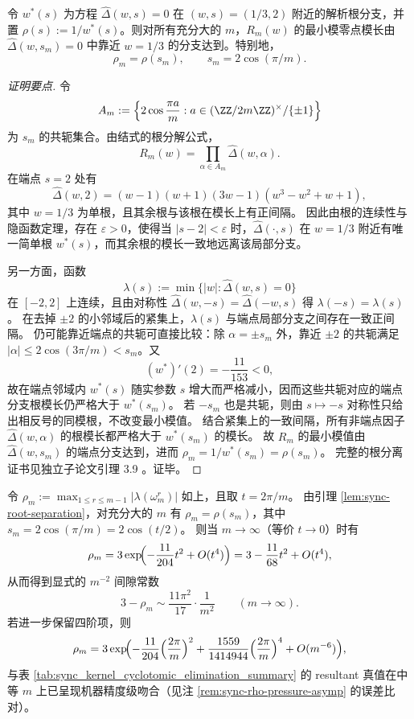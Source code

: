 \begin{lemma}\label{lem:sync-root-separation}
令 \(w^\ast(s)\) 为方程 \(\widehat\Delta(w,s)=0\) 在 \((w,s)=(1/3,2)\) 附近的解析根分支，并置
\(\rho(s):=1/w^\ast(s)\)。则对所有充分大的 \(m\)，\(R_m(w)\) 的最小模零点模长由
\(\widehat\Delta(w,s_m)=0\) 中靠近 \(w=1/3\) 的分支达到。特别地，
\[
\boxed{\;\rho_m=\rho(s_m),\qquad s_m=2\cos(\pi/m).\;}
\]
\end{lemma}
\begin{proof}[证明要点]
令
\[
A_m:=\left\{2\cos\frac{\pi a}{m}:a\in(\ZZ/2m\ZZ)^\times/\{\pm1\}\right\}
\]
为 \(s_m\) 的共轭集合。由结式的根分解公式，
\[
R_m(w)=\prod_{\alpha\in A_m}\widehat\Delta(w,\alpha).
\]
在端点 \(s=2\) 处有
\[
\widehat\Delta(w,2)=(w-1)(w+1)(3w-1)(w^3-w^2+w+1),
\]
其中 \(w=1/3\) 为单根，且其余根与该根在模长上有正间隔。
因此由根的连续性与隐函数定理，存在 \(\varepsilon>0\)，使得当
\(|s-2|<\varepsilon\) 时，\(\widehat\Delta(\cdot,s)\) 在 \(w=1/3\) 附近有唯一简单根
\(w^\ast(s)\)，而其余根的模长一致地远离该局部分支。
\par
另一方面，函数
\[
\lambda(s):=\min\{|w|:\widehat\Delta(w,s)=0\}
\]
在 \([-2,2]\) 上连续，且由对称性
\(\widehat\Delta(w,-s)=\widehat\Delta(-w,s)\) 得 \(\lambda(-s)=\lambda(s)\)。
在去掉 \(\pm2\) 的小邻域后的紧集上，\(\lambda(s)\) 与端点局部分支之间存在一致正间隔。
仍可能靠近端点的共轭可直接比较：除 \(\alpha=\pm s_m\) 外，靠近 \(\pm2\) 的共轭满足
\(|\alpha|\le 2\cos(3\pi/m)<s_m\)。又
\[
(w^\ast)'(2)=-\frac{11}{153}<0,
\]
故在端点邻域内 \(w^\ast(s)\) 随实参数 \(s\) 增大而严格减小，因而这些共轭对应的端点分支根模长仍严格大于 \(w^\ast(s_m)\)。
若 \(-s_m\) 也是共轭，则由 \(s\mapsto -s\) 对称性只给出相反号的同模根，不改变最小模值。
结合紧集上的一致间隔，所有非端点因子
\(\widehat\Delta(w,\alpha)\) 的根模长都严格大于 \(w^\ast(s_m)\) 的模长。
故 \(R_m\) 的最小模值由 \(\widehat\Delta(w,s_m)\) 的端点分支达到，进而
\(\rho_m=1/w^\ast(s_m)=\rho(s_m)\)。
完整的根分离证书见独立子论文引理 3.9
\cite{Internal2026SelfDualSynchronisationKernelCyclotomicTwists}。证毕。
\end{proof}

\begin{corollary}\label{cor:sync-rho-gap-m2}
令 \(\rho_m:=\max_{1\le r\le m-1}|\lambda(\omega_m^r)|\) 如上，且取 \(t=2\pi/m\)。
由引理 \ref{lem:sync-root-separation}，对充分大的 \(m\) 有
\(\rho_m=\rho(s_m)\)，其中 \(s_m=2\cos(\pi/m)=2\cos(t/2)\)。
则当 \(m\to\infty\)（等价 \(t\to 0\)）时有
\[
\rho_m
=3\exp\!\Bigl(-\frac{11}{204}t^2+O(t^4)\Bigr)
=3-\frac{11}{68}t^2+O(t^4),
\]
从而得到显式的 \(m^{-2}\) 间隙常数
\[
\boxed{\;
3-\rho_m\sim \frac{11\pi^2}{17}\cdot\frac{1}{m^2}\qquad(m\to\infty).
\;}
\]
若进一步保留四阶项，则
\[
\rho_m
=3\exp\!\Bigl(-\frac{11}{204}\Bigl(\frac{2\pi}{m}\Bigr)^2+\frac{1559}{1414944}\Bigl(\frac{2\pi}{m}\Bigr)^4+O(m^{-6})\Bigr),
\]
与表 \ref{tab:sync_kernel_cyclotomic_elimination_summary} 的 resultant 真值在中等 \(m\) 上已呈现机器精度级吻合（见注 \ref{rem:sync-rho-pressure-asymp} 的误差比对）。
\end{corollary}

